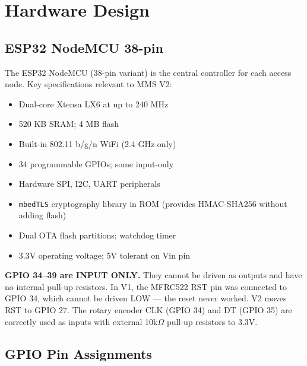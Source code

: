 \chapter{Hardware Design}
\label{ch:hardware}

\section{ESP32 NodeMCU 38-pin}

The ESP32 NodeMCU (38-pin variant) is the central controller for each access node. Key specifications relevant to MMS V2:

\begin{itemize}[leftmargin=1.5em]
    \item Dual-core Xtensa LX6 at up to 240 MHz
    \item 520 KB SRAM; 4 MB flash
    \item Built-in 802.11 b/g/n WiFi (2.4 GHz only)
    \item 34 programmable GPIOs; some input-only
    \item Hardware SPI, I2C, UART peripherals
    \item \texttt{mbedTLS} cryptography library in ROM (provides HMAC-SHA256 without adding flash)
    \item Dual OTA flash partitions; watchdog timer
    \item 3.3V operating voltage; 5V tolerant on Vin pin
\end{itemize}

\begin{warnbox}
\textbf{GPIO 34--39 are INPUT ONLY.} They cannot be driven as outputs and have no internal pull-up resistors. In V1, the MFRC522 RST pin was connected to GPIO 34, which cannot be driven LOW --- the reset never worked. V2 moves RST to GPIO 27. The rotary encoder CLK (GPIO 34) and DT (GPIO 35) are correctly used as inputs with external 10k$\Omega$ pull-up resistors to 3.3V.
\end{warnbox}

\section{GPIO Pin Assignments}

